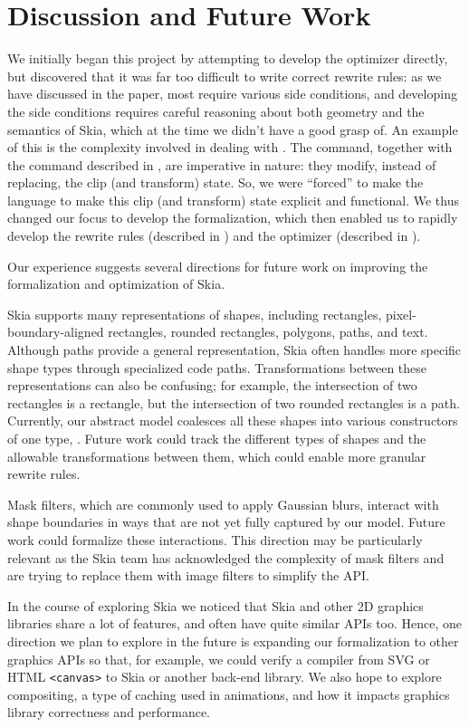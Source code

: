 \documentclass[main.tex]{subfiles}
\begin{document}
\section{Discussion and Future Work}
\label{sec:discussion}

We initially began this project by attempting to develop the optimizer directly,
  but discovered that it was far too difficult to write correct rewrite rules:
  as we have discussed in the paper, most require various side conditions,
  and developing the side conditions requires careful reasoning
  about both geometry and the semantics of Skia,
  which at the time we didn’t have a good grasp of.
An example of this is the complexity involved in dealing with .
The \Clip command,
  together with the \Transform command described in ,
  are imperative in nature:
  they modify, instead of replacing, the clip (and transform) state.
So, we were ``forced'' to make the \Layer language to make this clip (and transform) state explicit and functional.
We thus changed our focus to develop the formalization,
  which then enabled us to rapidly develop the rewrite rules (described in ) and
  the optimizer (described in ).

Our experience suggests several directions for future work on improving
  the formalization and optimization of Skia.

Skia supports many representations of shapes,
  including rectangles, pixel-boundary-aligned rectangles,
  rounded rectangles, polygons, paths, and text.
Although paths provide a general representation, Skia often handles more specific shape types through specialized code paths.
Transformations between these representations can also be confusing;
for example, the intersection of two rectangles is a rectangle,
  but the intersection of two rounded rectangles is a path.
Currently, our abstract model coalesces all these shapes into various constructors of one type, \Shape.
Future work could track the different types of shapes and the allowable transformations between them,
  which could enable more granular rewrite rules.

Mask filters, which are commonly used to apply Gaussian blurs,
  interact with shape boundaries in ways that are not yet fully captured by our model.
Future work could formalize these interactions.
This direction may be particularly relevant as
  the Skia team has acknowledged the complexity of mask filters
  and are trying to replace them with image filters to simplify the API.

In the course of exploring Skia we noticed that Skia and other 2D graphics libraries share a lot of features,
  and often have quite similar APIs too.
Hence, one direction we plan to explore in the future
  is expanding our formalization to other graphics APIs so that,
  for example, we could verify a compiler from SVG or HTML \texttt{<canvas>} to Skia or another back-end library.
We also hope to explore compositing,
 a type of caching used in animations,
 and how it impacts graphics library correctness and performance.
\end{document}
